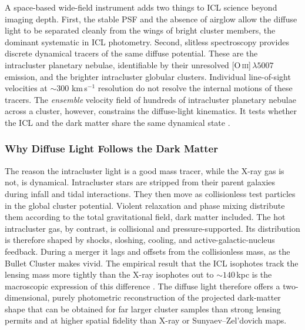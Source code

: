 A space-based wide-field instrument adds two things to ICL science beyond imaging depth. First, the stable PSF and the absence of airglow allow the diffuse light to be separated cleanly from the wings of bright cluster members, the dominant systematic in ICL photometry. Second, slitless spectroscopy provides discrete dynamical tracers of the same diffuse potential. These are the intracluster planetary nebulae, identifiable by their unresolved [O\,\textsc{iii}]\,$\lambda5007$ emission, and the brighter intracluster globular clusters. Individual line-of-sight velocities at $\sim300$ km\,s$^{-1}$ resolution do not resolve the internal motions of these tracers. The \emph{ensemble} velocity field of hundreds of intracluster planetary nebulae across a cluster, however, constrains the diffuse-light kinematics. It tests whether the ICL and the dark matter share the same dynamical state \cite{montes2022review}.

\subsubsection{Why Diffuse Light Follows the Dark Matter}

The reason the intracluster light is a good mass tracer, while the X-ray gas is not, is dynamical. Intracluster stars are stripped from their parent galaxies during infall and tidal interactions. They then move as collisionless test particles in the global cluster potential. Violent relaxation and phase mixing distribute them according to the total gravitational field, dark matter included. The hot intracluster gas, by contrast, is collisional and pressure-supported. Its distribution is therefore shaped by shocks, sloshing, cooling, and active-galactic-nucleus feedback. During a merger it lags and offsets from the collisionless mass, as the Bullet Cluster makes vivid. The empirical result that the ICL isophotes track the lensing mass more tightly than the X-ray isophotes out to $\sim140$\,kpc is the macroscopic expression of this difference \cite{montes2019icl}. The diffuse light therefore offers a two-dimensional, purely photometric reconstruction of the projected dark-matter shape that can be obtained for far larger cluster samples than strong lensing permits and at higher spatial fidelity than X-ray or Sunyaev--Zel'dovich maps.

